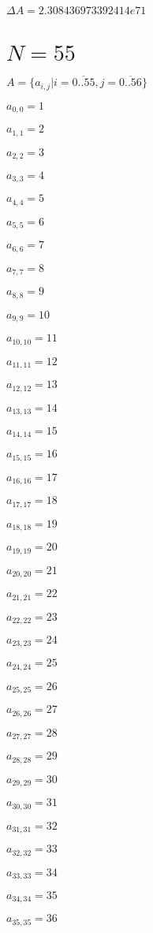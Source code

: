 \documentclass[a4paper,12pt]{article}
\begin{document}
$\Delta A = 2.308436973392414e71$



\section{ $N = 55$ }
$A = \{ a _{ i, j } | i = \overline { 0..55 }, j = \overline { 0..56 } \}$

$a _{ 0, 0 } = 1$

$a _{ 1, 1 } = 2$

$a _{ 2, 2 } = 3$

$a _{ 3, 3 } = 4$

$a _{ 4, 4 } = 5$

$a _{ 5, 5 } = 6$

$a _{ 6, 6 } = 7$

$a _{ 7, 7 } = 8$

$a _{ 8, 8 } = 9$

$a _{ 9, 9 } = 10$

$a _{ 10, 10 } = 11$

$a _{ 11, 11 } = 12$

$a _{ 12, 12 } = 13$

$a _{ 13, 13 } = 14$

$a _{ 14, 14 } = 15$

$a _{ 15, 15 } = 16$

$a _{ 16, 16 } = 17$

$a _{ 17, 17 } = 18$

$a _{ 18, 18 } = 19$

$a _{ 19, 19 } = 20$

$a _{ 20, 20 } = 21$

$a _{ 21, 21 } = 22$

$a _{ 22, 22 } = 23$

$a _{ 23, 23 } = 24$

$a _{ 24, 24 } = 25$

$a _{ 25, 25 } = 26$

$a _{ 26, 26 } = 27$

$a _{ 27, 27 } = 28$

$a _{ 28, 28 } = 29$

$a _{ 29, 29 } = 30$

$a _{ 30, 30 } = 31$

$a _{ 31, 31 } = 32$

$a _{ 32, 32 } = 33$

$a _{ 33, 33 } = 34$

$a _{ 34, 34 } = 35$

$a _{ 35, 35 } = 36$
\end{document}
